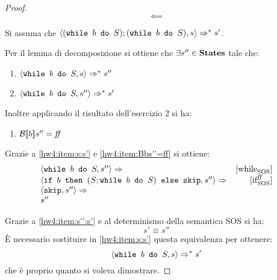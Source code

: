 {\begin{proof}
$$\boxed{\impliedby}$$

Si assuma che $\confSs{(\wbS{b}{S}); (\wbS{b}{S})}{s} \Rar{*} s'$.


Per il lemma di decomposizione si ottiene che $\exists s'' \in \states$ tale che:
\begin{enumerate}[label=(\Roman*)]
	\item $\confSs{\wbS{b}{S}}{s} \Rar{*} s''$
	\label{hw4:item:s:s'}
	\item $\confSs{\wbS{b}{S}}{s''} \Rar{*} s'$
	\label{hw4:item:s'':s'}
\end{enumerate}
Inoltre applicando il risultato dell'esercizio 2 si ha:
\begin{enumerate}[label=(\alph*)]
	\item $\B{b}'' = \semfalse$
	\label{hw4:item:Bbs''=ff}
\end{enumerate}
Grazie a \ref{hw4:item:s:s'} e \ref{hw4:item:Bbs''=ff} si ottiene:
$$
\begin{array}{lr}
\confSs{\wbS{b}{S}}{s''} \Rar{}& \whileSOS\\
\confSs{\ifABC{b}{(S; \wbS{b}{S})}{\skipForFriends}}{s''} \Rar{}& \ifffSOS \\
\confSs{\skipForFriends}{s''} \Rar{}& \\
s''
\end{array}
$$


Grazie a \ref{hw4:item:s'':s'} e al determinismo della semantica SOS
si ha: 
$$
s' \equiv{ } s''
$$
È necessario sostituire in \ref{hw4:item:s:s'} questa equivalenza per ottenere:
$$
\confSs{\wbS{b}{S}}{s} \Rar{*} s'
$$ 
che è proprio quanto si voleva dimostrare.
\end{proof}
}
